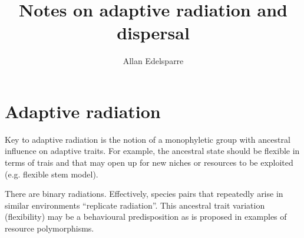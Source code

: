 \documentclass[11pt]{article}
\title{\textbf{Notes on adaptive radiation and dispersal}}
\author{Allan Edelsparre}
\date{}
\begin{document}
\maketitle

\section{Adaptive radiation}

Key to adaptive radiation is the notion of a monophyletic group with ancestral influence on adaptive traits. For example, the ancestral state should be flexible in terms of trais and that may open up for new niches or resources to be exploited (e.g. flexible stem model).

There are binary radiations. Effectively, species pairs that repeatedly arise in similar environments ``replicate radiation''. This ancestral trait variation (flexibility) may be a behavioural predisposition as is proposed in examples of resource polymorphisms.
\end{document}
